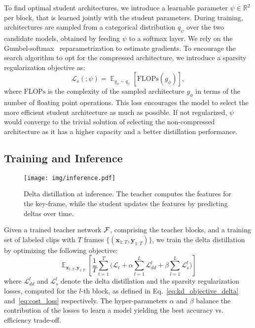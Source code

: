\documentclass[runningheads]{llncs}
\DeclareMathOperator\E{\mathop{{}\mathbb{E}}}
\def\R{\mathbb{R}}
\def\x{\mathbf{x}}
\def\y{\mathbf{y}}
\def\gphi{g_{\phi}}
\def\Ldd{\mathcal{L}_{dd}}
\def\Lcost{\mathcal{L}_{s}}
\def\Ltask{\mathcal{L}_{t}}
\begin{document}
To find optimal student architectures, we introduce a learnable parameter $\psi\in\R^2$ per block, that is learned jointly with the student parameters. During training, architectures are sampled from a categorical distribution $q_{\psi}$ over the two candidate models, obtained by feeding $\psi$ to a softmax layer. We rely on the Gumbel-softmax~\cite{jang2016categorical,maddison2016concrete} reparametrization to estimate gradients.
To encourage the search algorithm to opt for the compressed architecture, we introduce a sparsity regularization objective as:
\begin{equation}
\label{eq:cost_loss}
\Lcost(;\psi) = \E_{\gphi\sim q_{\psi}} \left[\text{FLOPs}(\gphi)\right],
\end{equation}
where $\text{FLOPs}$ is the complexity of the sampled architecture $\gphi$ in terms of the number of floating point operations. This loss encourages the model to select the more efficient student architecture as much as possible.
If not regularized, $\psi$ would converge to the trivial solution of selecting the non-compressed architecture as it has a higher capacity and a better distillation performance.
\subsection{Training and Inference}
\label{sec:training}
\begin{figure}[t!]
\centering
\texttt{[image: img/inference.pdf]}
\caption{Delta distillation at inference.
The teacher computes the features for the key-frame, while the student updates the features by predicting deltas over time.}
\label{fig:dd_forward_pass}
\vspace{-4mm}
\end{figure} Given a trained teacher network $\mathcal{F}$, comprising the teacher blocks, and a training set of labeled clips with $T$ frames $\{(\x_{1:T}, \y_{1:T})\}$, we train the delta distillation by optimizing the following objective:
\begin{equation}
\label{eq:overall_loss}
    \E_{\x_{1:T},\y_{1:T}} \left[\frac{1}{T}\sum_{t=1}^T \big(\Ltask +\alpha \sum_{l=1}^L \Ldd^l + \beta  \sum_{l=1}^L \Lcost^l\big)\right]
\end{equation}
where $\Ldd^l$ and $\Lcost^l$ denote the delta distillation and the sparsity regularization losses, computed for the $l$-th block, as defined in Eq.~\ref{eq:kd_objective_delta} and~\ref{eq:cost_loss} respectively. The hyper-parameters $\alpha$ and $\beta$ balance the contribution of the losses to learn a model yielding the best accuracy vs. efficiency trade-off.
\end{document}
